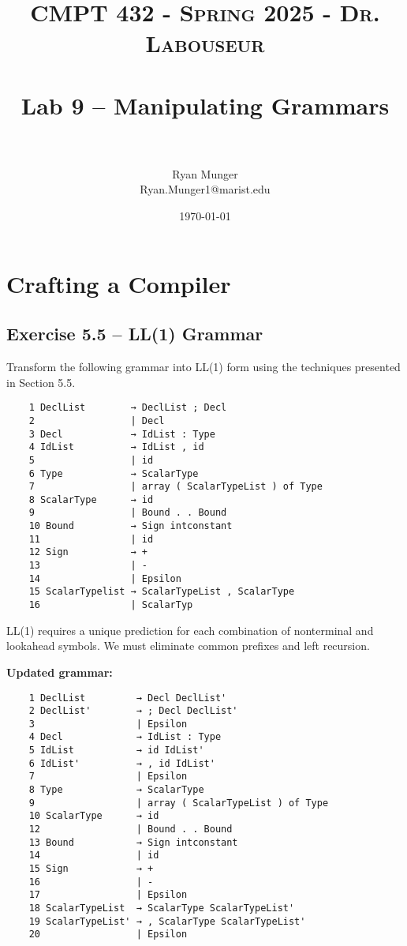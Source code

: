 \documentclass[letterpaper, 10pt]{article}
\title{	
   \normalfont \normalsize 
   \textsc{CMPT 432 - Spring 2025 - Dr. Labouseur} \\[10pt] %
   \horrule{0.5pt} \\[0.25cm] 	%
   \huge Lab 9 -- Manipulating Grammars \\     	    %
   \horrule{0.5pt} \\[0.25cm] 	%
}
\author{Ryan Munger \\ \normalsize Ryan.Munger1@marist.edu}
\date{\normalsize\today} 	%
\begin{document}
\maketitle %


\vspace{-.7cm}

\section{Crafting a Compiler}
\subsection{Exercise 5.5 -- LL(1) Grammar}
Transform the following grammar into LL(1) form using the techniques presented in Section 5.5. 

\begin{verbatim}
    1 DeclList        → DeclList ; Decl
    2                 | Decl
    3 Decl            → IdList : Type
    4 IdList          → IdList , id
    5                 | id
    6 Type            → ScalarType
    7                 | array ( ScalarTypeList ) of Type
    8 ScalarType      → id
    9                 | Bound . . Bound
    10 Bound          → Sign intconstant
    11                | id
    12 Sign           → +
    13                | -
    14                | Epsilon
    15 ScalarTypelist → ScalarTypeList , ScalarType
    16                | ScalarTyp
\end{verbatim}


\noindent
LL(1) requires a unique prediction for each combination of nonterminal and lookahead symbols. We must eliminate common prefixes and left recursion. 

\newpage \noindent
\textbf{Updated grammar:}

\begin{verbatim} 
    1 DeclList         → Decl DeclList'
    2 DeclList'        → ; Decl DeclList' 
    3                  | Epsilon
    4 Decl             → IdList : Type
    5 IdList           → id IdList'
    6 IdList'          → , id IdList' 
    7                  | Epsilon
    8 Type             → ScalarType
    9                  | array ( ScalarTypeList ) of Type
    10 ScalarType      → id
    12                 | Bound . . Bound
    13 Bound           → Sign intconstant
    14                 | id
    15 Sign            → +
    16                 | -
    17                 | Epsilon
    18 ScalarTypeList  → ScalarType ScalarTypeList'
    19 ScalarTypeList' → , ScalarType ScalarTypeList' 
    20                 | Epsilon
\end{verbatim}
\end{document}
